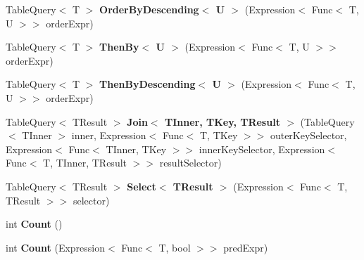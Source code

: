 \begin{DoxyCompactItemize}
\item 
\hypertarget{classSQLite_1_1TableQuery_3_01T_01_4_aacf40c5e9162c7f25ebdb78a2811aec9}{Table\-Query$<$ T $>$ {\bfseries Order\-By\-Descending$<$ U $>$} (Expression$<$ Func$<$ T, U $>$$>$ order\-Expr)}\label{classSQLite_1_1TableQuery_3_01T_01_4_aacf40c5e9162c7f25ebdb78a2811aec9}

\item 
\hypertarget{classSQLite_1_1TableQuery_3_01T_01_4_a8fd46c541dda61605ecdcada1684b9b7}{Table\-Query$<$ T $>$ {\bfseries Then\-By$<$ U $>$} (Expression$<$ Func$<$ T, U $>$$>$ order\-Expr)}\label{classSQLite_1_1TableQuery_3_01T_01_4_a8fd46c541dda61605ecdcada1684b9b7}

\item 
\hypertarget{classSQLite_1_1TableQuery_3_01T_01_4_a589fb8db3bbfe57b0f08aeea32e574ee}{Table\-Query$<$ T $>$ {\bfseries Then\-By\-Descending$<$ U $>$} (Expression$<$ Func$<$ T, U $>$$>$ order\-Expr)}\label{classSQLite_1_1TableQuery_3_01T_01_4_a589fb8db3bbfe57b0f08aeea32e574ee}

\item 
\hypertarget{classSQLite_1_1TableQuery_3_01T_01_4_a292ef3b90067c4393cf377c369d942a1}{Table\-Query$<$ T\-Result $>$ {\bfseries Join$<$ T\-Inner, T\-Key, T\-Result $>$} (Table\-Query$<$ T\-Inner $>$ inner, Expression$<$ Func$<$ T, T\-Key $>$$>$ outer\-Key\-Selector, Expression$<$ Func$<$ T\-Inner, T\-Key $>$$>$ inner\-Key\-Selector, Expression$<$ Func$<$ T, T\-Inner, T\-Result $>$$>$ result\-Selector)}\label{classSQLite_1_1TableQuery_3_01T_01_4_a292ef3b90067c4393cf377c369d942a1}

\item 
\hypertarget{classSQLite_1_1TableQuery_3_01T_01_4_a3726c9bfa1bb9a0efa35f847a3d9d77e}{Table\-Query$<$ T\-Result $>$ {\bfseries Select$<$ T\-Result $>$} (Expression$<$ Func$<$ T, T\-Result $>$$>$ selector)}\label{classSQLite_1_1TableQuery_3_01T_01_4_a3726c9bfa1bb9a0efa35f847a3d9d77e}

\item 
\hypertarget{classSQLite_1_1TableQuery_3_01T_01_4_afc74d6d1b8ca720c3a26d6a0c0ca6b86}{int {\bfseries Count} ()}\label{classSQLite_1_1TableQuery_3_01T_01_4_afc74d6d1b8ca720c3a26d6a0c0ca6b86}

\item 
\hypertarget{classSQLite_1_1TableQuery_3_01T_01_4_abe589a906a2c592fc25587d441acca33}{int {\bfseries Count} (Expression$<$ Func$<$ T, bool $>$$>$ pred\-Expr)}\label{classSQLite_1_1TableQuery_3_01T_01_4_abe589a906a2c592fc25587d441acca33}


\end{DoxyCompactItemize}

